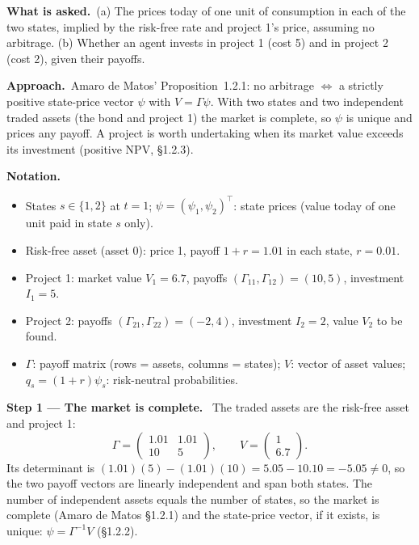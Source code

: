 \documentclass[11pt,a4paper]{article}
\numberwithin{equation}{section}
\newcommand{\step}[2]{\par\medskip\noindent\textbf{Step #1 --- #2.}~}
\newenvironment{notation}{\par\noindent\textbf{Notation.}\begin{itemize}[leftmargin=1.4em]}{\end{itemize}}
\newcommand{\asked}{\par\medskip\noindent\textbf{What is asked.}~}
\newcommand{\approach}{\par\smallskip\noindent\textbf{Approach.}~}
\begin{document}
\asked (a) The prices today of one unit of consumption in each of the two states, implied by the
risk-free rate and project 1's price, assuming no arbitrage. (b) Whether an agent invests in
project 1 (cost 5) and in project 2 (cost 2), given their payoffs.

\approach Amaro de Matos' Proposition~1.2.1: no arbitrage $\Leftrightarrow$ a strictly positive
state-price vector $\psi$ with $V=\Gamma\psi$. With two states and two independent traded assets
(the bond and project 1) the market is complete, so $\psi$ is unique and prices any payoff. A
project is worth undertaking when its market value exceeds its investment (positive NPV, \S1.2.3).

\begin{notation}
  \item States $s\in\{1,2\}$ at $t=1$; $\psi=(\psi_1,\psi_2)^\top$: state prices (value today of one unit paid in state $s$ only).
  \item Risk-free asset (asset 0): price 1, payoff $1+r=1.01$ in each state, $r=0.01$.
  \item Project 1: market value $V_1=6.7$, payoffs $(\Gamma_{11},\Gamma_{12})=(10,5)$, investment $I_1=5$.
  \item Project 2: payoffs $(\Gamma_{21},\Gamma_{22})=(-2,4)$, investment $I_2=2$, value $V_2$ to be found.
  \item $\Gamma$: payoff matrix (rows = assets, columns = states); $V$: vector of asset values; $q_s=(1+r)\psi_s$: risk-neutral probabilities.
\end{notation}

\step{1}{The market is complete} The traded assets are the risk-free asset and project 1:
\begin{equation}\label{eq:14gamma}
  \Gamma = \begin{pmatrix} 1.01 & 1.01\\ 10 & 5\end{pmatrix}, \qquad V = \begin{pmatrix} 1\\ 6.7\end{pmatrix}.
\end{equation}
Its determinant is $(1.01)(5)-(1.01)(10)=5.05-10.10=-5.05\ne0$, so the two payoff vectors are
linearly independent and span both states. The number of independent assets equals the number
of states, so the market is complete (Amaro de Matos \S1.2.1) and the state-price vector, if it
exists, is unique: $\psi=\Gamma^{-1}V$ (\S1.2.2).
\end{document}
